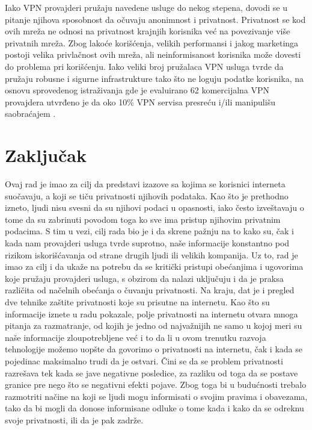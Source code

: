 \documentclass[a4paper]{article}
\begin{document}
\par Iako VPN provajderi pružaju navedene usluge do nekog stepena, dovodi se u pitanje njihova sposobnost da očuvaju anonimnost i privatnost. Privatnost se kod ovih mreža ne odnosi na privatnost krajnjih korisnika već na povezivanje više privatnih mreža. Zbog lakoće korišćenja, velikih performansi i jakog marketinga postoji velika privlačnost ovih mreža, ali neinformisanost korisnika može dovesti do problema pri korišćenju. Iako veliki broj pružalaca VPN usluga  tvrde da pružaju robusne i sigurne infrastrukture tako što ne loguju podatke korisnika, na osnovu sprovedenog istraživanja gde je evaluirano 62 komercijalna VPN provajdera utvrđeno je da oko 10\% VPN servisa presreću i/ili manipulišu saobraćajem \cite{vpn6}.

 
\section{Zaključak}
\label{sec:zakljucak}
Ovaj rad je imao za cilj da predstavi izazove sa kojima se korisnici interneta suočavaju, a koji se tiču privatnosti njihovih podataka. Kao što je prethodno izneto, ljudi nisu svesni da su njihovi podaci u opasnosti, iako često izveštavaju o tome da su zabrinuti povodom toga ko sve ima pristup njihovim privatnim podacima. S tim u vezi, cilj rada bio je i da skrene pažnju na to kako su, čak i kada nam provajderi usluga tvrde suprotno, naše informacije konstantno pod rizikom iskorišćavanja od strane drugih ljudi ili velikih kompanija. Uz to, rad je imao za cilj i da ukaže na potrebu da se kritički pristupi obećanjima i ugovorima koje pružaju provajderi usluga, s obzirom da nalazi uključuju i da je praksa različita od načelnih obećanja o čuvanju privatnosti. Na kraju, dat je i pregled dve tehnike zaštite privatnosti koje su prisutne na internetu. Kao što su informacije iznete u radu pokazale, polje privatnosti na internetu otvara mnoga pitanja za razmatranje, od kojih je jedno od najvažnijih ne samo u kojoj meri su naše informacije zloupotrebljene već i to da li u ovom trenutku razvoja tehnologije možemo uopšte da govorimo o privatnosti na internetu, čak i kada se pojedinac maksimalno trudi da je ostvari. Čini se da se problem privatnosti razrešava tek kada se jave negativne posledice, za razliku od toga da se postave granice pre nego što se negativni efekti pojave. Zbog toga bi u budućnosti trebalo razmotriti načine na koji se ljudi mogu informisati o svojim pravima i obavezama, tako da bi mogli da donose informisane odluke o tome kada i kako da se odreknu svoje privatnosti, ili da je pak zadrže.

 

\end{document}
